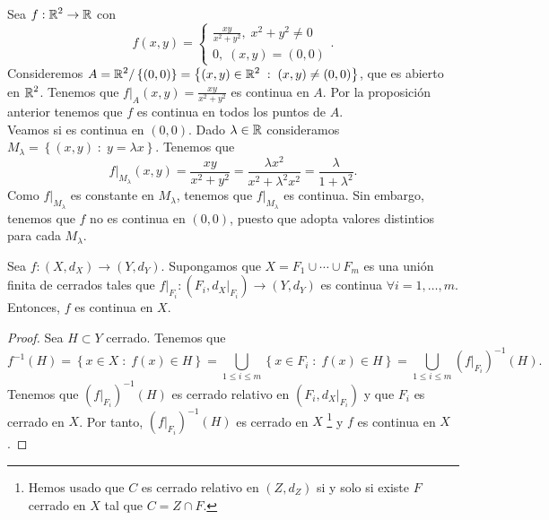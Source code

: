\begin{eg}
Sea $\displaystyle f : \mathbb{R}^{2} \to \mathbb{R} $ con 
\[f\left(x,y\right) = 
\begin{cases}
\frac{xy}{x^{2}+y^{2}}, \; x^{2} +y^{2} \neq 0 \\
0, \; \left(x,y\right) = \left(0,0\right)
\end{cases}
.\]
Consideremos $\displaystyle A =\mathbb{R}^{2} / \left\{ \left(0,0\right)\right\} = \left\{ \left(x,y\right) \in \mathbb{R}^{2} \; : \; \left(x,y\right) \neq \left(0,0\right)\right\}  $, que es abierto en $\displaystyle \mathbb{R}^{2} $. Tenemos que $\displaystyle f|_{A}\left(x,y\right) = \frac{xy}{x^{2} +y^{2}} $ es continua en $\displaystyle A $. Por la proposición anterior tenemos que $\displaystyle f $ es continua en todos los puntos de $\displaystyle A $. \\
Veamos si es continua en $\displaystyle \left(0,0\right) $. Dado $\displaystyle \lambda \in \mathbb{R} $ consideramos $\displaystyle M_{\lambda } = \left\{ \left(x,y\right) \; : \; y = \lambda x\right\}  $. Tenemos que
\[f | _{M_{\lambda }}\left(x,y\right) = \frac{xy}{x^{2} + y^{2}} = \frac{\lambda x^{2}}{x^{2} + \lambda^{2}x^{2}} = \frac{\lambda }{1 + \lambda ^{2}} .\]
Como $\displaystyle f|_{M_{\lambda }} $ es constante en $\displaystyle M_{\lambda } $, tenemos que $\displaystyle f|_{M_{\lambda }} $ es continua. Sin embargo, tenemos que $\displaystyle f $ no es continua en $\displaystyle \left(0,0\right) $, puesto que adopta valores distintios para cada $\displaystyle M_{\lambda} $.
\end{eg}
\begin{lema}
Sea $\displaystyle f : \left(X, d _{X}\right) \to \left(Y, d _{Y}\right) $. Supongamos que $\displaystyle X = F_{1} \cup \cdots \cup F_{m} $ es una unión finita de cerrados tales que $\displaystyle f|_{F_{i}} : \left(F_{i}, d _{X}|_{F_{i}}\right) \to \left(Y, d _{Y}\right) $ es continua $\displaystyle \forall i = 1, \ldots, m $. Entonces, $\displaystyle f $ es continua en $\displaystyle X $.
\end{lema}
\begin{proof}
Sea $\displaystyle H \subset Y $ cerrado. Tenemos que 
\[f^{-1}\left(H\right) = \left\{ x \in X \; : \; f\left(x\right) \in H\right\} = \bigcup_{1 \leq i \leq m} \left\{ x \in F_{i} \; : \; f\left(x\right) \in H\right\} = \bigcup_{1\leq i \leq m}\left(f|_{F_{i}}\right)^{-1}\left(H\right) .\]
Tenemos que $\displaystyle \left(f|_{F_{i}}\right)^{-1}\left(H\right) $ es cerrado relativo en $\displaystyle \left(F_{i}, d _{X}|_{F_{i}}\right) $ y que $\displaystyle F_{i} $ es cerrado en $\displaystyle X $. Por tanto, $\displaystyle \left(f|_{F_{i}}\right)^{-1}\left(H\right) $ es cerrado en $\displaystyle X $ \footnote{Hemos usado que $\displaystyle C $ es cerrado relativo en $\displaystyle \left(Z, d _{Z}\right) $ si y solo si existe $\displaystyle F $ cerrado en $\displaystyle X $ tal que $\displaystyle C = Z \cap F $.} y $\displaystyle f $ es continua en $\displaystyle X $.
\end{proof}
